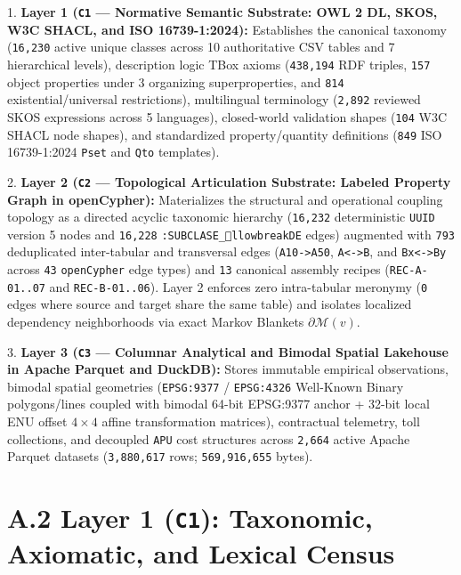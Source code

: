 \documentclass[10pt,a4paper]{article}
\begin{document}
1. \textbf{Layer 1 (\texttt{C1} --- Normative Semantic Substrate: OWL 2 DL, SKOS, W3C SHACL, and ISO 16739-1:2024):} Establishes the canonical taxonomy (\texttt{16,230} active unique classes across 10 authoritative CSV tables and 7 hierarchical levels), description logic TBox axioms (\texttt{438,194} RDF triples, \texttt{157} object properties under 3 organizing superproperties, and \texttt{814} existential/universal restrictions), multilingual terminology (\texttt{2,892} reviewed SKOS expressions across 5 languages), closed-world validation shapes (\texttt{104} W3C SHACL node shapes), and standardized property/quantity definitions (\texttt{849} ISO 16739-1:2024 \texttt{Pset} and \texttt{Qto} templates).\par
2. \textbf{Layer 2 (\texttt{C2} --- Topological Articulation Substrate: Labeled Property Graph in openCypher):} Materializes the structural and operational coupling topology as a directed acyclic taxonomic hierarchy (\texttt{16,232} deterministic \texttt{UUID} version 5 nodes and \texttt{16,228} \texttt{:SUBCLASE\_llowbreak{}DE} edges) augmented with \texttt{793} deduplicated inter-tabular and transversal edges (\texttt{A10->A50}, \texttt{A<->B}, and \texttt{Bx<->By} across \texttt{43} \texttt{openCypher} edge types) and \texttt{13} canonical assembly recipes (\texttt{REC-A-01..07} and \texttt{REC-B-01..06}). Layer 2 enforces zero intra-tabular meronymy (\texttt{0} edges where source and target share the same table) and isolates localized dependency neighborhoods via exact Markov Blankets $\partial\mathcal{M}(v)$.\par
3. \textbf{Layer 3 (\texttt{C3} --- Columnar Analytical and Bimodal Spatial Lakehouse in Apache Parquet and DuckDB):} Stores immutable empirical observations, bimodal spatial geometries (\texttt{EPSG:9377} / \texttt{EPSG:4326} Well-Known Binary polygons/lines coupled with bimodal 64-bit EPSG:9377 anchor + 32-bit local ENU offset $4\times 4$ affine transformation matrices), contractual telemetry, toll collections, and decoupled \texttt{APU} cost structures across \texttt{2,664} active Apache Parquet datasets (\texttt{3,880,617} rows; \texttt{569,916,655} bytes).\par



\section*{A.2 Layer 1 (\texttt{C1}): Taxonomic, Axiomatic, and Lexical Census}
\end{document}
